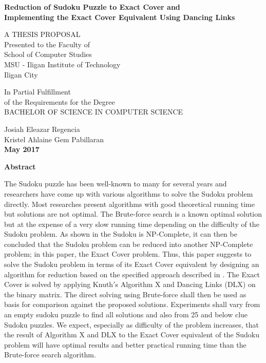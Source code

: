 \documentclass[a4paper,oneside,11pt]{report}
\begin{document}
\thispagestyle{empty}
\singlespacing
\begin{center}

{\bf\Large Reduction of Sudoku Puzzle to Exact Cover and}\\
{\bf\Large Implementing the Exact Cover Equivalent Using Dancing Links}

\vspace{\fill}

{A THESIS PROPOSAL}\\[.25in]

{Presented to the Faculty of\\
School of Computer Studies\\
MSU - Iligan Institute of Technology\\
Iligan City}

\vspace{\fill}

{In Partial Fulfillment\\
of the Requirements for the Degree\\
BACHELOR OF SCIENCE IN COMPUTER SCIENCE}\\

\vspace{\fill}

{Josiah Eleazar Regencia\\
Kristel Ahlaine Gem Pabillaran}\\
{\bf May 2017}

\end{center}

\newpage
\doublespacing
{}
\begin{center}
 \textbf{\Large Abstract}
\end{center}
\vspace{0.8cm}

The Sudoku puzzle has been well-known to many for several years and researchers have come up with various algorithms to solve the Sudoku problem directly. Most researches present algorithms with good theoretical running time but solutions are not optimal. The Brute-force search is a known optimal solution but at the expense of a very slow running time depending on the difficulty of the Sudoku problem. As shown in \cite{Yato} the Sudoku is NP-Complete, it can then be concluded that the Sudoku problem can be reduced into another NP-Complete problem; in this paper, the Exact Cover problem. Thus, this paper suggests to solve the Sudoku problem in terms of its Exact Cover equivalent by designing an algorithm for reduction based on the specified approach described in \cite{Harrysson}. The Exact Cover is solved by applying Knuth$'$s Algorithm X and Dancing Links (DLX) on the binary matrix. The direct solving using Brute-force shall then be used as basis for comparison against the proposed solutions. Experiments shall vary from an empty sudoku puzzle to find all solutions and also from 25 and below clue Sudoku puzzles. We expect, especially as difficulty of the problem increases, that the result of Algorithm X and DLX to the Exact Cover equivalent of the Sudoku problem will have optimal results and better practical running time than the Brute-force search algorithm.
\end{document}

